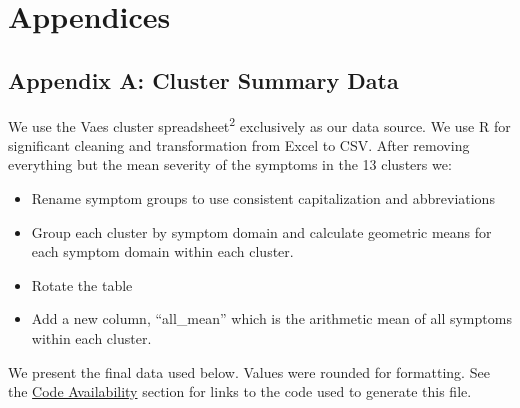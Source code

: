 \documentclass[
  letterpaper,
  DIV=11,
  numbers=noendperiod]{scrartcl}
\providecommand{\tightlist}{%
  \setlength{\itemsep}{0pt}\setlength{\parskip}{0pt}}
\begin{document}
\clearpage

\section{Appendices}\label{appendices}

\FloatBarrier

\subsection*{Appendix A: Cluster Summary Data}\label{sec-cluster-data}

We use the Vaes cluster spreadsheet\textsuperscript{2} exclusively as
our data source. We use R for significant cleaning and transformation
from Excel to CSV. After removing everything but the mean severity of
the symptoms in the 13 clusters we:

\begin{itemize}
\tightlist
\item
  Rename symptom groups to use consistent capitalization and
  abbreviations
\item
  Group each cluster by symptom domain and calculate geometric means for
  each symptom domain within each cluster.
\item
  Rotate the table
\item
  Add a new column, ``all\_mean'' which is the arithmetic mean of all
  symptoms within each cluster.
\end{itemize}

We present the final data used below. Values were rounded for
formatting. See the \hyperref[sec-code]{Code Availability} section for
links to the code used to generate this file.
\end{document}
